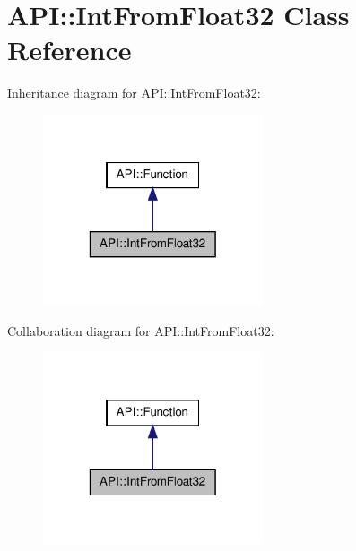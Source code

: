 \hypertarget{class_a_p_i_1_1_int_from_float32}{\section{A\-P\-I\-:\-:Int\-From\-Float32 Class Reference}
\label{class_a_p_i_1_1_int_from_float32}
}


Inheritance diagram for A\-P\-I\-:\-:Int\-From\-Float32\-:\nopagebreak
\begin{figure}[H]
\begin{center}
\leavevmode
\includegraphics[width=184pt]{class_a_p_i_1_1_int_from_float32__inherit__graph}
\end{center}
\end{figure}


Collaboration diagram for A\-P\-I\-:\-:Int\-From\-Float32\-:\nopagebreak
\begin{figure}[H]
\begin{center}
\leavevmode
\includegraphics[width=184pt]{class_a_p_i_1_1_int_from_float32__coll__graph}
\end{center}
\end{figure}
